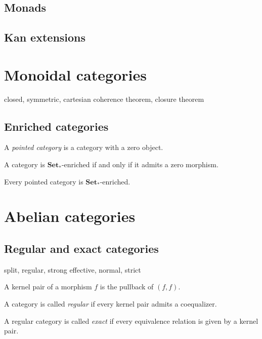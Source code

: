 \documentclass{../../large}
\newcommand{\Set}{\mathbf{Set}}
\begin{document}
\section{Monads}

\section{Kan extensions}



\chapter{Monoidal categories}
closed, symmetric, cartesian
coherence theorem, closure theorem

\section{Enriched categories}

\begin{prb}
A \emph{pointed category} is a category with a zero object.
\begin{parts}
\item A category is $\Set_*$-enriched if and only if it admits a zero morphism.
\item Every pointed category is $\Set_*$-enriched.
\end{parts}
\end{prb}

\chapter{Abelian categories}
\section{Regular and exact categories}

split, regular, strong
effective, normal, strict

A kernel pair of a morphism $f$ is the pullback of $(f,f)$.

A category is called \emph{regular} if every kernel pair admits a coequalizer.

\begin{prb}
A regular category is called \emph{exact} if every equivalence relation is given by a kernel pair.
\begin{parts}
\item
\end{parts}
\end{prb}
\end{document}
